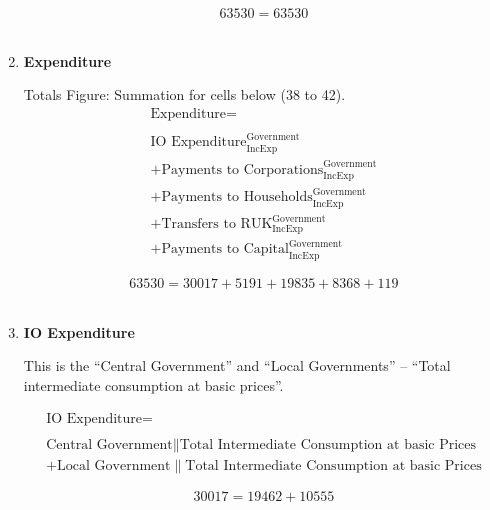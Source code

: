 \begin{enumerate}
\begin{equation} \nonumber
63530 = 63530
\end{equation}\\



\pagebreak

\item \textbf {Expenditure}

Totals Figure: Summation for cells below (38 to 42).\\

\begin{equation}
\begin{split}
\text{Expenditure} =  \\ \\
\text{IO Expenditure}^\text{Government}_\text{IncExp}\\
+\text{Payments to Corporations}^\text{Government}_\text{IncExp}\\
+\text{Payments to Households}^\text{Government}_\text{IncExp}\\
+\text{Transfers to RUK}^\text{Government}_\text{IncExp}\\
+\text{Payments to Capital}^\text{Government}_\text{IncExp}
\end{split} \label{eq:2.5.41}
\end{equation}

\begin{equation} \nonumber
63530 = 30017+5191+19835+8368+119
\end{equation}\\


\item \textbf {IO Expenditure}

This is the “Central Government” and “Local Governments” – “Total intermediate consumption at basic prices”. \cite{ScotGov2013a}

\begin{equation}
\begin{split}
\text{IO Expenditure} =  \\ \\
\text{Central Government}\|\text{Total Intermediate Consumption at basic Prices}\\
+\text{Local Government}\|\text{Total Intermediate Consumption at basic Prices}
\end{split} \label{eq:2.5.42}
\end{equation}

\begin{equation} \nonumber
30017 = 19462+10555
\end{equation}\\



\end{enumerate}
